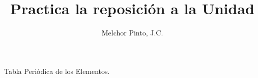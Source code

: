 \documentclass[12pt,addpoints]{repaso}
\title{Practica la reposición a la Unidad}
\author{Melchor Pinto, J.C.}
\begin{document}
\INFO
\begin{questions}
    \questionboxed[5]{}

    \questionboxed[4]{}
    \questionboxed[4]{}


    \newpage

    \begin{multicols}{2}
    \questionboxed[5]{}
    \questionboxed[5]{}
    \end{multicols}

    \begin{multicols}{2}
    \questionboxed[5]{}
    \questionboxed[5]{}
    \end{multicols}  

    \newpage

    \begin{multicols}{2}
        \questionboxed[5]{}
        \questionboxed[5]{}
    \end{multicols}
    \questionboxed[8]{}
    \questionboxed[5]{}
    \questionboxed[5]{}
    \begin{multicols}{2}
        \questionboxed[15]{}
        \questionboxed[15]{}
    \end{multicols}
    \questionboxed[5]{}
    \questionboxed[4]{}

\end{questions}
\begin{landscape}
    \begin{minipage}[b]{\textwidth}
        \thispagestyle{foot}
        \begin{table}[H]
            \centering
            \caption{Tabla Peri\'odica de los Elementos.}
            \TablaPeriodica[0.48]
            \label{tab:periodic_table}
        \end{table}
    \end{minipage}
\end{landscape}
\end{document}

